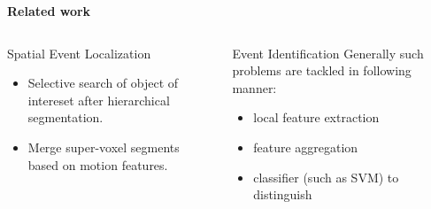 \begin{frame}{\textbf{Related work}}
\begin{columns}
	\begin{column}{0.45\textwidth}
		\begin{varblock}[\textwidth]{Spatial Event Localization}
			\begin{itemize}							
				\item Selective search of object of intereset after hierarchical segmentation\footnotemark.
				\item Merge super-voxel segments based on motion features\footnotemark.
			\end{itemize}
		\end{varblock}
	\end{column}
	\begin{column}{0.45\textwidth}
		\begin{varblock}[\textwidth]{Event Identification}
		 Generally such problems are tackled in following manner: 
			\begin{itemize}
				\item local feature extraction
				\item feature aggregation
				\item classifier (such as SVM) to distinguish
			\end{itemize}
		\end{varblock}
	\end{column}
\end{columns}	
\end{frame}
